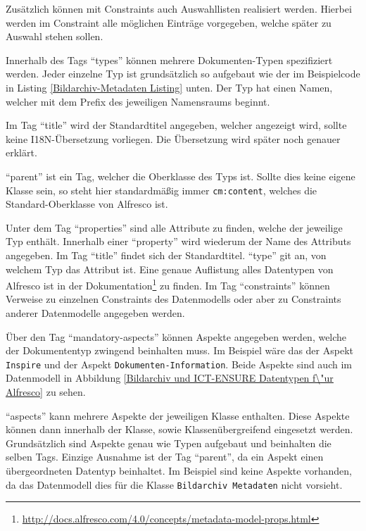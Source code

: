 Zus\"atzlich k\"onnen mit Constraints auch Auswahllisten realisiert werden. Hierbei werden im Constraint alle m\"oglichen Eintr\"age vorgegeben, welche sp\"ater zu Auswahl stehen sollen.

Innerhalb des Tags "`types"' k\"onnen mehrere Dokumenten-Typen spezifiziert werden. Jeder einzelne Typ ist grunds\"atzlich so aufgebaut wie der im Beispielcode in Listing \ref{Bildarchiv-Metadaten Listing} unten. Der Typ hat einen Namen, welcher mit dem Prefix des jeweiligen Namensraums beginnt. 

Im Tag "`title"' wird der Standardtitel angegeben, welcher angezeigt wird, sollte keine I18N-\"Ubersetzung vorliegen. Die \"Ubersetzung wird sp\"ater noch genauer erkl\"art.

"`parent"' ist ein Tag, welcher die Oberklasse des Typs ist. Sollte dies keine eigene Klasse sein, so steht hier standardm\"a\ss{}ig immer \texttt{cm:content}, welches die Standard-Oberklasse von Alfresco ist.

Unter dem Tag "`properties"' sind alle Attribute zu finden, welche der jeweilige Typ enth\"alt. Innerhalb einer "`property"' wird wiederum der Name des Attributs angegeben. Im Tag "`title"' findet sich der Standardtitel. "`type"' git an, von welchem Typ das Attribut ist. Eine genaue Auflistung alles Datentypen von Alfresco ist in der Dokumentation\footnote{\url{http://docs.alfresco.com/4.0/concepts/metadata-model-props.html}} zu finden. Im Tag "`constraints"' k\"onnen Verweise zu einzelnen Constraints des Datenmodells oder aber zu Constraints anderer Datenmodelle angegeben werden. 

\"Uber den Tag "`mandatory-aspects"' k\"onnen Aspekte angegeben werden, welche der Dokumententyp zwingend beinhalten muss. Im Beispiel w\"are das der Aspekt \texttt{Inspire} und der Aspekt \texttt{Dokumenten-Information}. Beide Aspekte sind auch im Datenmodell in Abbildung \ref{Bildarchiv und ICT-ENSURE Datentypen f\"ur Alfresco} zu sehen.

"`aspects"' kann mehrere Aspekte der jeweiligen Klasse enthalten. Diese Aspekte k\"onnen dann innerhalb der Klasse, sowie Klassen\"ubergreifend eingesetzt werden. Grunds\"atzlich sind Aspekte genau wie Typen aufgebaut und beinhalten die selben Tags. Einzige Ausnahme ist der Tag "`parent"', da ein Aspekt einen \"ubergeordneten Datentyp beinhaltet. Im Beispiel sind keine Aspekte vorhanden, da das Datenmodell dies f\"ur die Klasse \texttt{Bildarchiv Metadaten} nicht vorsieht. 



